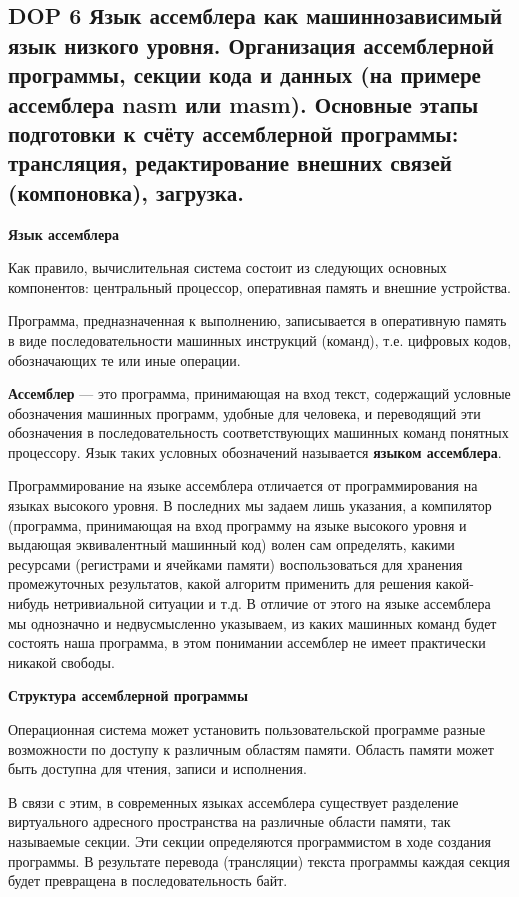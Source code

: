 \subsection{DOP 6 Язык  ассемблера  как  машиннозависимый  язык  низкого  уровня.  Организация  ассемблерной  программы, секции кода и данных (на примере ассемблера nasm или masm). Основные  этапы подготовки к счёту ассемблерной программы: трансляция, редактирование внешних связей (компоновка), загрузка.}

\textbf{Язык ассемблера}

Как правило, вычислительная система состоит из следующих основных компонентов: центральный процессор, оперативная память и внешние устройства. 

Программа, предназначенная к выполнению, записывается в оперативную память в виде последовательности машинных инструкций (команд), т.е. цифровых кодов, обозначающих те или иные операции.

\textbf{Ассемблер} --- это программа, принимающая на вход текст, содержащий условные обозначения машинных программ, удобные для человека, и переводящий эти обозначения в последовательность соответствующих машинных команд понятных процессору. 
Язык таких условных обозначений называется \textbf{языком ассемблера}.

Программирование на языке ассемблера отличается от программирования на языках высокого уровня. 
В последних мы задаем лишь указания, а компилятор (программа, принимающая на вход программу на языке высокого уровня и выдающая эквивалентный машинный код) волен сам определять, какими ресурсами (регистрами и ячейками памяти) воспользоваться для хранения промежуточных результатов, какой алгоритм применить для решения какой-нибудь нетривиальной ситуации и т.д. 
В отличие от этого на языке ассемблера мы однозначно и недвусмысленно указываем, из каких машинных команд будет состоять наша программа, в этом понимании ассемблер не имеет практически никакой свободы.

\textbf{Структура ассемблерной программы}

Операционная система может установить пользовательской программе разные возможности по доступу к различным областям памяти. Область памяти может быть доступна для чтения, записи и исполнения.

В связи с этим, в современных языках ассемблера существует разделение виртуального адресного пространства на различные области памяти, так называемые секции. 
Эти секции определяются программистом в ходе создания программы.
В результате перевода (трансляции) текста программы каждая секция будет превращена в последовательность байт. 

